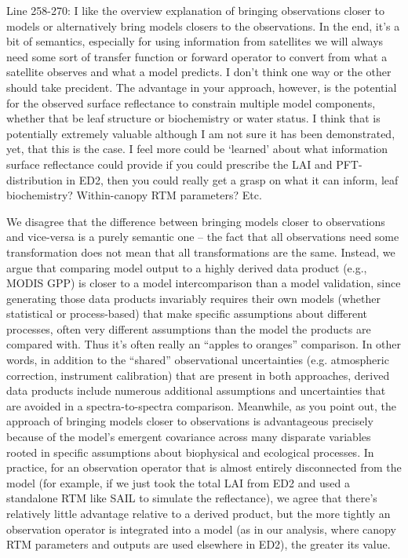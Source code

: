 \begin{reviewer}
  Line 258-270: I like the overview explanation of bringing observations closer to models or alternatively bring models closers to the observations. In the end, it’s a bit of semantics, especially for using information from satellites we will always need some sort of transfer function or forward operator to convert from what a satellite observes and what a model predicts. I don’t think one way or the other should take precident. The advantage in your approach, however, is the potential for the observed surface reflectance to constrain multiple model components, whether that be leaf structure or biochemistry or water status. I think that is potentially extremely valuable although I am not sure it has been demonstrated, yet, that this is the case. I feel more could be ‘learned’ about what information surface reflectance could provide if you could prescribe the LAI and PFT-distribution in ED2, then you could really get a grasp on what it can inform, leaf biochemistry? Within-canopy RTM parameters? Etc.
\end{reviewer}

We disagree that the difference between bringing models closer to observations and vice-versa is a purely semantic one -- the fact that all observations need some transformation does not mean that all transformations are the same. Instead, we argue that comparing model output to a highly derived data product (e.g., MODIS GPP) is closer to a model intercomparison than a model validation, since generating those data products invariably requires their own models (whether statistical or process-based) that make specific assumptions about different processes, often very different assumptions than the model the products are compared with. Thus it's often really an “apples to oranges'' comparison.  In other words, in addition to the “shared” observational uncertainties (e.g. atmospheric correction, instrument calibration) that are present in both approaches, derived data products include numerous additional assumptions and uncertainties that are avoided in a spectra-to-spectra comparison. Meanwhile, as you point out, the approach of bringing models closer to observations is advantageous precisely because of the model’s emergent covariance across many disparate variables rooted in specific assumptions about biophysical and ecological processes. In practice, for an observation operator that is almost entirely disconnected from the model (for example, if we just took the total LAI from ED2 and used a standalone RTM like SAIL to simulate the reflectance), we agree that there’s relatively little advantage relative to a derived product, but the more tightly an observation operator is integrated into a model (as in our analysis, where canopy RTM parameters and outputs are used elsewhere in ED2), the greater its value.

